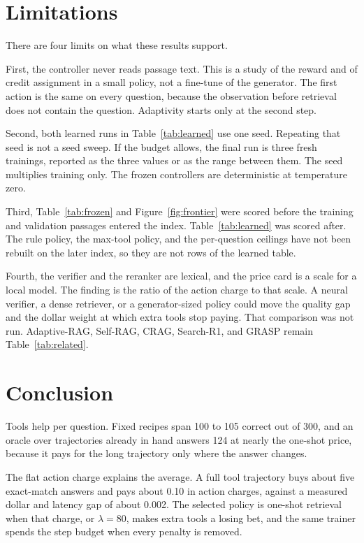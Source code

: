 \documentclass[letterpaper]{article} %
\begin{document}
\section{Limitations}
There are four limits on what these results support.

First, the controller never reads passage text. This is a study of the reward and of credit assignment in a small policy, not a fine-tune of the generator. The first action is the same on every question, because the observation before retrieval does not contain the question. Adaptivity starts only at the second step.

Second, both learned runs in Table~\ref{tab:learned} use one seed. Repeating that seed is not a seed sweep. If the budget allows, the final run is three fresh trainings, reported as the three values or as the range between them. The seed multiplies training only. The frozen controllers are deterministic at temperature zero.

Third, Table~\ref{tab:frozen} and Figure~\ref{fig:frontier} were scored before the training and validation passages entered the index. Table~\ref{tab:learned} was scored after. The rule policy, the max-tool policy, and the per-question ceilings have not been rebuilt on the later index, so they are not rows of the learned table.

Fourth, the verifier and the reranker are lexical, and the price card is a scale for a local model. The finding is the ratio of the action charge to that scale. A neural verifier, a dense retriever, or a generator-sized policy could move the quality gap and the dollar weight at which extra tools stop paying. That comparison was not run. Adaptive-RAG, Self-RAG, CRAG, Search-R1, and GRASP remain Table~\ref{tab:related}.

\section{Conclusion}
Tools help per question. Fixed recipes span 100 to 105 correct out of 300, and an oracle over trajectories already in hand answers 124 at nearly the one-shot price, because it pays for the long trajectory only where the answer changes.

The flat action charge explains the average. A full tool trajectory buys about five exact-match answers and pays about 0.10 in action charges, against a measured dollar and latency gap of about 0.002. The selected policy is one-shot retrieval when that charge, or \(\lambda{=}80\), makes extra tools a losing bet, and the same trainer spends the step budget when every penalty is removed.
\end{document}
